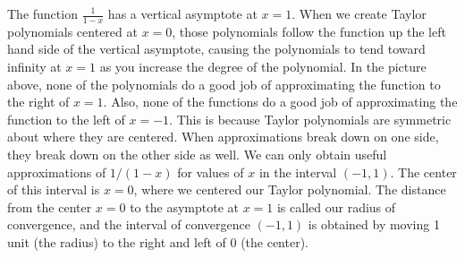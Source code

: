 The function $\frac{1}{1-x}$ has a vertical asymptote at $x=1$.  When we create Taylor polynomials centered at $x=0$, those polynomials follow the function up the left hand side of the vertical asymptote, causing the polynomials to tend toward infinity at $x=1$ as you increase the degree of the polynomial.  In the picture above, none of the polynomials do a good job of approximating the function to the right of $x=1$. Also, none of the functions do a good job of approximating the function to the left of $x=-1$. This is because Taylor polynomials are symmetric about where they are centered. When approximations break down on one side, they break down on the other side as well. We can only obtain useful approximations of $1/(1-x)$ for values of $x$ in the interval $(-1,1)$. The center of this interval is $x=0$, where we centered our Taylor polynomial. The distance from the center $x=0$ to the asymptote at $x=1$ is called our radius of convergence, and the interval of convergence $(-1,1)$ is obtained by moving 1 unit (the radius) to the right and left of 0 (the center).

%
%





